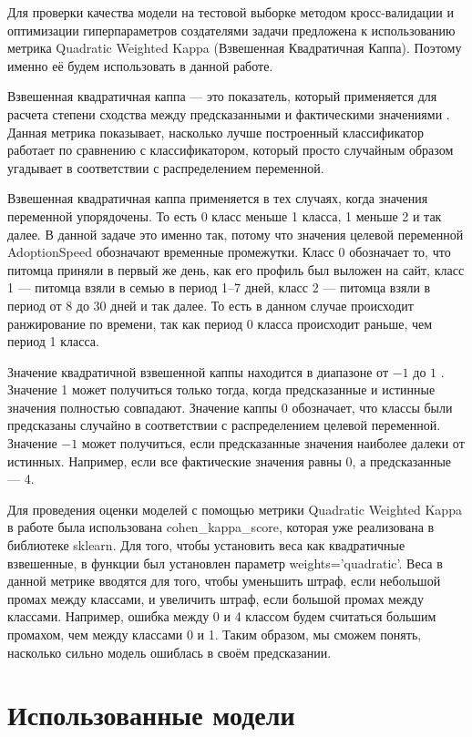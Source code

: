 \documentclass[14pt]{mmcs_article}
\begin{document}
Для проверки качества модели на тестовой выборке методом кросс-валидации и оптимизации гиперпараметров создателями задачи предложена к использованию метрика Quadratic Weighted Kappa (Взвешенная Квадратичная Каппа). Поэтому именно её будем использовать в данной работе. 

Взвешенная квадратичная каппа --- это показатель, который применяется для расчета степени сходства между предсказанными и фактическими значениями \cite{lib:kappa1}. Данная метрика показывает, насколько лучше построенный классификатор работает по сравнению с классификатором, который просто случайным образом угадывает в соответствии с распределением переменной.

Взвешенная квадратичная каппа применяется в тех случаях, когда значения переменной упорядочены. То есть 0 класс меньше 1 класса, 1 меньше 2 и так далее. В данной задаче это именно так, потому что значения целевой переменной AdoptionSpeed обозначают временные промежутки. Класс 0 обозначает то, что питомца приняли в первый же день, как его профиль был выложен на сайт, класс 1 --- питомца взяли в семью в период 1--7 дней, класс 2 --- питомца взяли в период от 8 до 30 дней и так далее. То есть в данном случае происходит ранжирование по времени, так как период 0 класса происходит раньше, чем период 1 класса.

Значение квадратичной взвешенной каппы находится в диапазоне от $-1$ до $1$ \cite{lib:kappa2}. Значение 1 может получиться только тогда, когда предсказанные и истинные значения полностью совпадают. Значение каппы 0 обозначает, что классы были предсказаны случайно в соответствии с распределением целевой переменной. Значение $-1$ может получиться, если предсказанные значения наиболее далеки от истинных. Например, если все фактические значения равны 0, а предсказанные --- 4.

Для проведения оценки моделей с помощью метрики Quadratic Weighted Kappa в работе была использована cohen\_kappa\_score, которая уже реализована в библиотеке sklearn. Для того, чтобы установить веса как квадратичные взвешенные, в функции был установлен параметр weights='quadratic'. Веса в данной метрике вводятся для того, чтобы уменьшить штраф, если небольшой промах между классами, и увеличить штраф, если большой промах между классами. Например, ошибка между 0 и 4 классом будем считаться большим промахом, чем между классами 0 и 1. Таким образом, мы сможем понять, насколько сильно модель ошиблась в своём предсказании.


\newpage
\section{Использованные модели}
\end{document}
